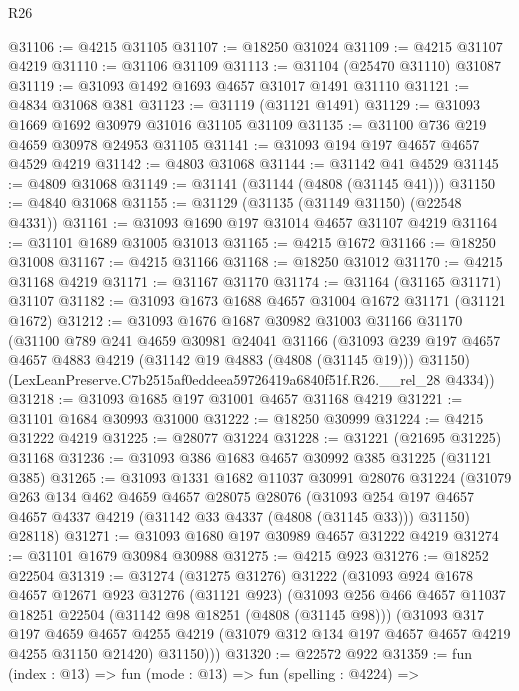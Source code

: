 \begin{lexlean}{R26}
\begin{coremodule}
@31106 := @4215 @31105
@31107 := @18250 @31024
@31109 := @4215 @31107 @4219
@31110 := @31106 @31109
@31113 := @31104 (@25470 @31110) @31087
@31119 := @31093 @1492 @1693 @4657 @31017 @1491 @31110
@31121 := @4834 @31068 @381
@31123 := @31119 (@31121 @1491)
@31129 := @31093 @1669 @1692 @30979 @31016 @31105 @31109
@31135 := @31100 @736 @219 @4659 @30978 @24953 @31105
@31141 := @31093 @194 @197 @4657 @4657 @4529 @4219
@31142 := @4803 @31068
@31144 := @31142 @41 @4529
@31145 := @4809 @31068
@31149 := @31141 (@31144 (@4808 (@31145 @41)))
@31150 := @4840 @31068
@31155 := @31129 (@31135 (@31149 @31150) (@22548 @4331))
@31161 := @31093 @1690 @197 @31014 @4657 @31107 @4219
@31164 := @31101 @1689 @31005 @31013
@31165 := @4215 @1672
@31166 := @18250 @31008
@31167 := @4215 @31166
@31168 := @18250 @31012
@31170 := @4215 @31168 @4219
@31171 := @31167 @31170
@31174 := @31164 (@31165 @31171) @31107
@31182 := @31093 @1673 @1688 @4657 @31004 @1672 @31171 (@31121 @1672)
@31212 := @31093
    @1676
    @1687
    @30982
    @31003
    @31166
    @31170
    (@31100
      @789
      @241
      @4659
      @30981
      @24041
      @31166
      (@31093 @239 @197 @4657 @4657 @4883 @4219 (@31142 @19 @4883 (@4808 (@31145 @19))) @31150)
      (LexLeanPreserve.C7b2515af0eddeea59726419a6840f51f.R26.__rel_28 @4334))
@31218 := @31093 @1685 @197 @31001 @4657 @31168 @4219
@31221 := @31101 @1684 @30993 @31000
@31222 := @18250 @30999
@31224 := @4215 @31222 @4219
@31225 := @28077 @31224
@31228 := @31221 (@21695 @31225) @31168
@31236 := @31093 @386 @1683 @4657 @30992 @385 @31225 (@31121 @385)
@31265 := @31093
    @1331
    @1682
    @11037
    @30991
    @28076
    @31224
    (@31079
      @263
      @134
      @462
      @4659
      @4657
      @28075
      @28076
      (@31093 @254 @197 @4657 @4657 @4337 @4219 (@31142 @33 @4337 (@4808 (@31145 @33))) @31150)
      @28118)
@31271 := @31093 @1680 @197 @30989 @4657 @31222 @4219
@31274 := @31101 @1679 @30984 @30988
@31275 := @4215 @923
@31276 := @18252 @22504
@31319 := @31274
    (@31275 @31276)
    @31222
    (@31093
      @924
      @1678
      @4657
      @12671
      @923
      @31276
      (@31121 @923)
      (@31093
        @256
        @466
        @4657
        @11037
        @18251
        @22504
        (@31142 @98 @18251 (@4808 (@31145 @98)))
        (@31093
          @317
          @197
          @4659
          @4657
          @4255
          @4219
          (@31079 @312 @134 @197 @4657 @4657 @4219 @4255 @31150 @21420)
          @31150)))
@31320 := @22572 @922
@31359 := fun (index : @13) =>
  fun (mode : @13) =>
  fun (spelling : @4224) =>

\end{coremodule}
\end{lexlean}
